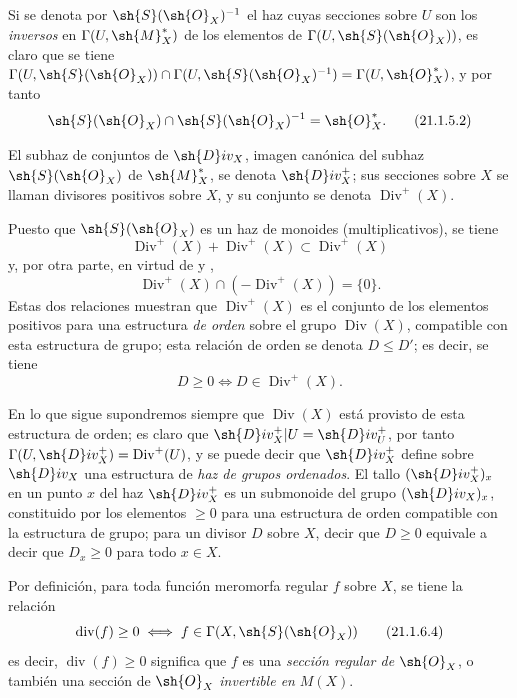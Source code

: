 Si se denota por $\sh{S}(\sh{O}_X)^{-1}$ el haz cuyas secciones sobre $U$ son los \emph{inversos} en $\Gamma(U,\sh{M}_X^*)$ de los elementos de $\Gamma(U,\sh{S}(\sh{O}_X))$, es claro que se tiene $\Gamma(U,\sh{S}(\sh{O}_X))\cap\Gamma(U,\sh{S}(\sh{O}_X)^{-1})=\Gamma(U,\sh{O}_X^*)$, y por tanto
\[
\label{IV.21.1.5.2}
  \sh{S}(\sh{O}_X)\cap\sh{S}(\sh{O}_X)^{-1}=\sh{O}_X^*.
  \tag{21.1.5.2}
\]

\begin{definition}[21.1.6]
\label{IV.21.1.6}
El subhaz de conjuntos de $\sh{D}iv_X$, imagen canónica del subhaz $\sh{S}(\sh{O}_X)$ de $\sh{M}_X^*$, se denota $\sh{D}iv_X^+$; sus secciones sobre $X$ se llaman divisores positivos sobre $X$, y su conjunto se denota $\operatorname{Div}^+(X)$.
\end{definition}

Puesto que $\sh{S}(\sh{O}_X)$ es un haz de monoides (multiplicativos), se tiene
\[
\label{IV.21.1.6.1}
  \operatorname{Div}^+(X)+\operatorname{Div}^+(X)\subset\operatorname{Div}^+(X)
  \tag{21.1.6.1}
\]
y, por otra parte, en virtud de  y ,
\[
\label{IV.21.1.6.2}
  \operatorname{Div}^+(X)\cap(-\operatorname{Div}^+(X))=\{0\}.
  \tag{21.1.6.2}
\]
Estas dos relaciones muestran que $\operatorname{Div}^+(X)$ es el conjunto de los elementos positivos para una estructura \emph{de orden} sobre el grupo $\operatorname{Div}(X)$, compatible con esta estructura de grupo; esta relación de orden se denota $D\leq D'$; es decir, se tiene
\[
\label{IV.21.1.6.3}
  D\geq0 \iff D\in\operatorname{Div}^+(X).
  \tag{21.1.6.3}
\]

En lo que sigue supondremos siempre que $\operatorname{Div}(X)$ está provisto de esta estructura de orden;
es claro que $\sh{D}iv_X^+|U=\sh{D}iv_U^+$, por tanto $\Gamma(U,\sh{D}iv_X^+)=\operatorname{Div}^+(U)$, y se puede decir que $\sh{D}iv_X^+$ define sobre $\sh{D}iv_X$ una estructura de \emph{haz de grupos ordenados}.
El tallo $(\sh{D}iv_X^+)_x$ en un punto $x$ del haz $\sh{D}iv_X^+$ es un submonoide del grupo $(\sh{D}iv_X)_x$, constituido por los elementos $\geq0$ para una estructura de orden compatible con la estructura de grupo;
para un divisor $D$ sobre $X$, decir que $D\geq0$ equivale a decir que $D_x\geq0$ para todo $x\in X$.

Por definición, para toda función meromorfa regular $f$ sobre $X$, se tiene la relación
\[
\label{IV.21.1.6.4}
  \operatorname{div}(f)\geq0 \iff f\in\Gamma(X,\sh{S}(\sh{O}_X))
  \tag{21.1.6.4}
\]
es decir, $\operatorname{div}(f)\geq0$ significa que $f$ es una \emph{sección regular de} $\sh{O}_X$, o también una sección de $\sh{O}_X$ \emph{invertible en} $M(X)$.

